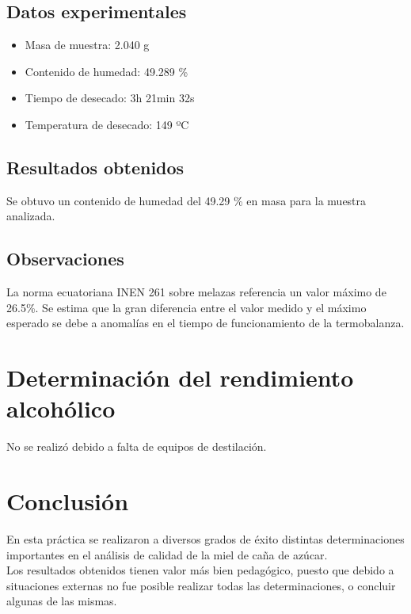 \documentclass[a4paper,12pt]{article} %
\begin{document}
\subsection{Datos experimentales}
\begin{itemize}
    \item Masa de muestra: 2.040 g
    \item Contenido de humedad: 49.289 \%
    \item Tiempo de desecado: 3h 21min 32s
    \item Temperatura de desecado: 149 ºC
    
\end{itemize}
\subsection{Resultados obtenidos}
Se obtuvo un contenido de humedad del 49.29 \% en masa para la muestra analizada.
\subsection{Observaciones}
La norma ecuatoriana INEN 261 sobre melazas referencia un valor máximo de 26.5\%. Se estima que la gran diferencia entre el valor medido y el máximo esperado se debe a anomalías en el tiempo de funcionamiento de la termobalanza. 

\section{Determinación del rendimiento alcohólico}
No se realizó debido a falta de equipos de destilación.

\section{Conclusión}

En esta práctica se realizaron a diversos grados de éxito distintas determinaciones importantes en el análisis de calidad de la miel de caña de azúcar. \\

Los resultados obtenidos tienen valor más bien pedagógico, puesto que debido a situaciones externas no fue posible realizar todas las determinaciones, o concluir algunas de las mismas. \\
\end{document}

